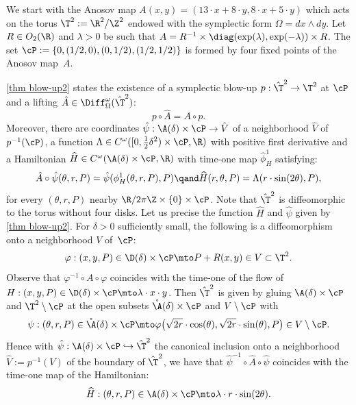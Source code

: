 We start with the Anosov map $A(x,y)= (13\cdot x+8\cdot y, 8\cdot x+5\cdot y)$ which acts on the torus $\T^2:= \R^2/\Z^2$ endowed with the symplectic form $\Omega=dx\wedge dy$. Let $R\in O_2(\R)$ and $\lambda>0$ be such that $A= R^{-1}\times \diag (\exp (\lambda), \exp(-\lambda)) \times R $.
The set $\cP:= \{0, (1/2, 0), (0,1/2),(1/2,1/2)\}$ is formed by four fixed points of the Anosov map~$A$.

\cref{thm blow-up2} states the existence of a symplectic blow-up $p: \hat \T^2 \to \T^2 $ at $\cP$ and a lifting $\hat A\in \Diff^\omega_\Omega(\hat \T^2)$:
\[p\circ \hat A= A\circ p.\]
Moreover, there are coordinates $\hat \psi: \A(\delta)\times \cP \to \hat V$ of a neighborhood $\hat V$ of $p^{-1}(\cP)$,
a function $\Lambda\in C^\omega([0,\tfrac12 \delta^2) \times \cP,\R)$ with positive first derivative
and a Hamiltonian $\widehat H\in C^\omega (\A(\delta)\times \cP, \R)$ with time-one map $\hat \phi_H^1$ satisfying:
\[\hat A \circ \hat \psi(\theta, r,P) = \hat \psi(\phi_H^1(\theta,r,P), P) \qand \widehat H (r,\theta,P)= \Lambda (r \cdot \sin(2\theta),P), \]
for every $(\theta,r,P)$ nearby $\R/2\pi \Z\times \{0\}\times \cP$.
Note that $\hat \T^2$ is diffeomorphic to the torus without four disks. Let us precise the function $\hat H$ and $\hat \psi$ given by \cref{thm blow-up2}.
For $\delta>0$ sufficiently small, the following is a diffeomorphism onto a neighborhood $V$ of~$\cP$:
\[
\varphi: (x,y,P)\in \D(\delta)\times \cP \mto
P+R(x,y)\in V\subset \T^2.
\]
Observe that $\varphi^{-1} \circ A\circ \varphi $ coincides with the time-one of the flow of $H: (x,y,P)\in \D(\delta)\times \cP\mto \lambda \cdot x\cdot y$. Then $\hat \T^2$ is given by gluing
$\A(\delta)\times \cP$ and
$\T^2\setminus \cP$ at the open subsets $ \mathring\A(\delta)\times \cP $ and $ V \setminus \cP$ with
\begin{equation}\label{eq psi3}\psi: (\theta,r,P)\in\mathring\A(\delta) \times \cP \mto \varphi\bigl(\sqrt{2r } \cdot \cos (\theta), \sqrt{2r }\cdot \sin (\theta),P\bigr)\in V \setminus \cP.\end{equation}
Hence with $\hat \psi: \A(\delta)\times \cP \hookrightarrow \hat \T^2$ the canonical inclusion onto a neighborhood $\hat V:= p^{-1}(V)$ of the boundary of $ \hat \T^2$, we have that $\hat \psi ^{-1} \circ \hat A\circ \hat \psi$ coincides with the time-one map of the Hamiltonian:
\begin{equation}\label{def:H} \widehat H: (\theta,r,P)\in \A(\delta)\times \cP\mto \lambda\cdot r \cdot \sin(2\theta).\end{equation}

